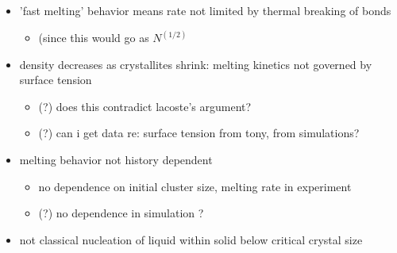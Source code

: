 \documentclass[11pt]{article}
\begin{document}
\begin{itemize}
\begin{itemize}

\item 'fast melting' behavior means rate not limited by thermal breaking of bonds\\
\label{sec-3.1.2.4.1}

\begin{itemize}

\item (since this would go as $N^(1/2)$\\
\label{sec-3.1.2.4.1.1}

\end{itemize} %

\item density decreases as crystallites shrink: melting kinetics not governed by surface tension\\
\label{sec-3.1.2.4.2}

\begin{itemize}

\item (?) does this contradict lacoste's argument?\\
\label{sec-3.1.2.4.2.1}


\item (?) can i get data re: surface tension from tony, from simulations?\\
\label{sec-3.1.2.4.2.2}

\end{itemize} %

\item melting behavior not history dependent\\
\label{sec-3.1.2.4.3}

\begin{itemize}

\item no dependence on initial cluster size, melting rate in experiment\\
\label{sec-3.1.2.4.3.1}


\item (?) no dependence in simulation ?\\
\label{sec-3.1.2.4.3.2}

\end{itemize} %

\item not classical nucleation of liquid within solid below critical crystal size\\
\label{sec-3.1.2.4.4}


\end{itemize}
\end{itemize}
\end{document}
